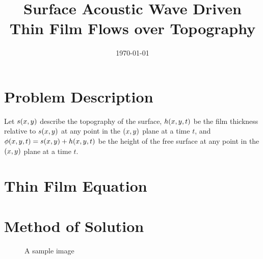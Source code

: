 \documentclass[letterpaper]{article}
\title{Surface Acoustic Wave Driven Thin Film Flows over Topography}
\author{}
\date{\today}
\begin{document}
 
\maketitle

\section{Problem Description}

Let $s\!\left( x, y \right)$ describe the topography of the surface, 
$h\!\left( x,y,t \right)$ be the film thickness relative to $s\!\left( x,y \right)$ at any point in the $\left( x,y \right)$ plane at a time $t$, 
and $\phi\!\left( x,y,t \right) = s\!\left( x,y \right) + h\!\left( x,y,t \right)$ be the height of the free surface at any point in the $\left( x,y \right)$ plane at a time $t$.

\section{Thin Film Equation}

 
\section{Method of Solution}

\begin{figure}[h]  
    \centering
    \resizebox{.75\linewidth}{!}{}
    \caption{A sample image}
\end{figure}
 
\newpage
\printbibliography
\end{document}
